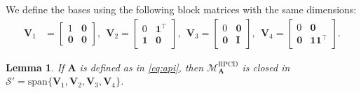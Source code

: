 \documentclass{article}
\theoremstyle{plain}
\newtheorem{lemma}[theorem]{Lemma}
\theoremstyle{definition}
\theoremstyle{remark}
\renewcommand{\sp}{\mathrm{span}}
\newcommand{\RPCD}{\text{RPCD}} %
\newcommand{\MARPCD}{\mathcal{M}_{\bm{A}}^{\RPCD}} %
\def\vone{{\bm{1}}}
\def\mA{{\bm{A}}}
\def\mI{{\bm{I}}}
\def\mV{{\bm{V}}}
\def\gS{{\mathcal{S}}}
\begin{document}
We define the bases using the following block matrices with the same dimensions:
\begin{align*}
    \mV_{1} &= \begin{bmatrix}
        1 & \bm{0} \\ \bm{0} & \bm{0}
    \end{bmatrix}, \ \ 
    \mV_{2} = \begin{bmatrix}
        0 & \vone^{\top} \\ \vone & \bm{0}
    \end{bmatrix}, \ \
    \mV_{3} = \begin{bmatrix}
        0 & \bm{0} \\ \bm{0} & \mI
    \end{bmatrix}, \ \
    \mV_{4} = \begin{bmatrix}
        0 & \bm{0} \\ \bm{0} & \vone \vone^{\top}
    \end{bmatrix}.
\end{align*}

\begin{lemma}
    \label{lem:almostpi}
    If $\mA$ is defined as in \eqref{eq:api}, then \textnormal{$\MARPCD$} is closed in $\gS' = \sp \{ \mV_{1}, \mV_{2}, \mV_{3}, \mV_{4} \}$.
\end{lemma}
\end{document}
